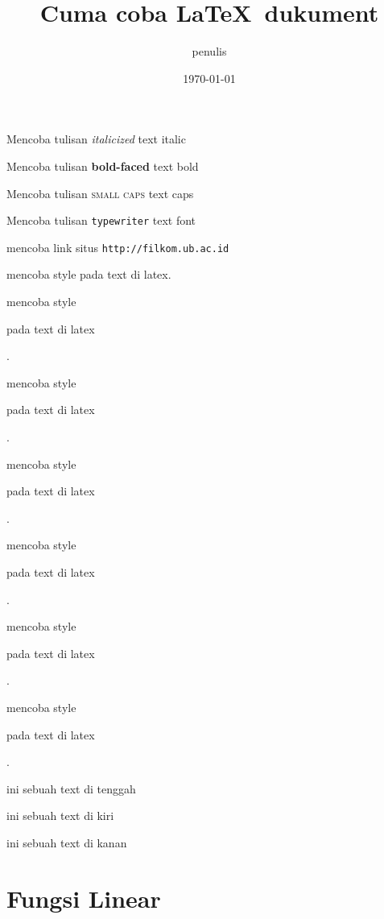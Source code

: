 \documentclass[11pt]{article}
\begin{document}
\tableofcontents

\title{Cuma coba \LaTeX \ dukument}
\author{penulis}
\date{\today}
\maketitle

Mencoba tulisan \textit{italicized} text italic

Mencoba tulisan \textbf{bold-faced} text bold

Mencoba tulisan \textsc{small caps} text caps

Mencoba tulisan \texttt{typewriter} text font

mencoba link situs \texttt{http://filkom.ub.ac.id}

mencoba style pada text di latex.

mencoba style \begin{large} pada text di latex\end{large}.

mencoba style \begin{Large} pada text di latex\end{Large}.

mencoba style \begin{huge} pada text di latex\end{huge}.

mencoba style \begin{Huge} pada text di latex\end{Huge}.

mencoba style \begin{small} pada text di latex\end{small}.

mencoba style \begin{tiny} pada text di latex\end{tiny}.

\begin{center}
	ini sebuah text di tenggah
\end{center}

\begin{flushleft}
	ini sebuah text di kiri
\end{flushleft}

\begin{flushright}
	ini sebuah text di kanan
\end{flushright}

\section{Fungsi Linear}
\end{document}
